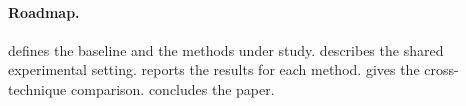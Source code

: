 \paragraph{Roadmap.}
 defines the baseline and the methods under study.
 describes the shared experimental setting.
 reports the results for each method.
 gives the cross-technique comparison.
 concludes the paper.